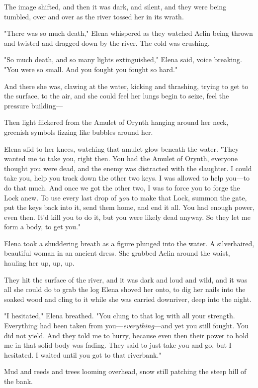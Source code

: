 The image shifted, and then it was dark, and silent, and they were being tumbled, over and over as the river tossed her in its wrath.

"There was so much death," Elena whispered as they watched Aelin being thrown and twisted and dragged down by the river. The cold was crushing.

"So much death, and so many lights extinguished," Elena said, voice breaking. "You were so small. And you fought  you fought so hard."

And there she was, clawing at the water, kicking and thrashing, trying to get to the surface, to the air, and she could feel her lungs begin to seize, feel the pressure building---

Then light flickered from the Amulet of Orynth hanging around her neck, greenish symbols fizzing like bubbles around her.

Elena slid to her knees, watching that amulet glow beneath the water. "They wanted me to take you, right then. You had the Amulet of Orynth, everyone thought you were dead, and the enemy was distracted with the slaughter. I could take you, help you track down the other two keys. I was allowed to help you---to do that much. And once we got the other two, I was to force you to forge the Lock anew. To use every last drop of \emph{you} to make that Lock, summon the gate, put the keys back into it, send them home, and end it all. You had enough power, even then. It'd kill you to do it, but you were likely dead anyway. So they let me form a body, to get you."

Elena took a shuddering breath as a figure plunged into the water. A silverhaired, beautiful woman in an ancient dress. She grabbed Aelin around the waist, hauling her up, up, up.

They hit the surface of the river, and it was dark and loud and wild, and it was all she could do to grab the log Elena shoved her onto, to dig her nails into the soaked wood and cling to it while she was carried downriver, deep into the night.

"I hesitated," Elena breathed. "You clung to that log with all your strength. Everything had been taken from you---\emph{everything}---and yet you still fought. You did not yield. And they told me to hurry, because even then their power to hold me in that solid body was fading. They said to just take you and go, but  I hesitated. I waited until you got to that riverbank."

Mud and reeds and trees looming overhead, snow still patching the steep hill of the bank.

